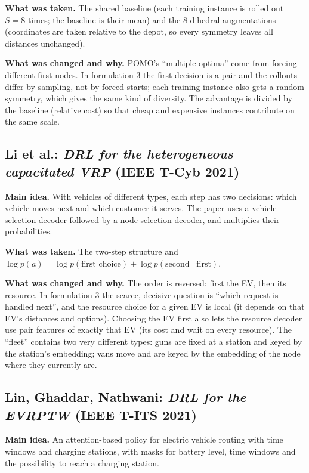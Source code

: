 \textbf{What was taken.} The shared baseline (each training instance is rolled out $S=8$ times; the baseline is their mean) and the 8 dihedral augmentations (coordinates are taken relative to the depot, so every symmetry leaves all distances unchanged).

\textbf{What was changed and why.} POMO's ``multiple optima'' come from forcing different first nodes. In formulation 3 the first decision is a pair and the rollouts differ by sampling, not by forced starts; each training instance also gets a random symmetry, which gives the same kind of diversity. The advantage is divided by the baseline (relative cost) so that cheap and expensive instances contribute on the same scale.

\subsection{Li et al.: \emph{DRL for the heterogeneous capacitated VRP} (IEEE T-Cyb 2021)}

\textbf{Main idea.} With vehicles of different types, each step has two decisions: which vehicle moves next and which customer it serves. The paper uses a vehicle-selection decoder followed by a node-selection decoder, and multiplies their probabilities.

\textbf{What was taken.} The two-step structure and $\log p(a)=\log p(\text{first choice})+\log p(\text{second}\mid\text{first})$.

\textbf{What was changed and why.} The order is reversed: first the EV, then its resource. In formulation 3 the scarce, decisive question is ``which request is handled next'', and the resource choice for a given EV is local (it depends on that EV's distances and options). Choosing the EV first also lets the resource decoder use pair features of exactly that EV (its cost and wait on every resource). The ``fleet'' contains two very different types: guns are fixed at a station and keyed by the station's embedding; vans move and are keyed by the embedding of the node where they currently are.

\subsection{Lin, Ghaddar, Nathwani: \emph{DRL for the EVRPTW} (IEEE T-ITS 2021)}

\textbf{Main idea.} An attention-based policy for electric vehicle routing with time windows and charging stations, with masks for battery level, time windows and the possibility to reach a charging station.

